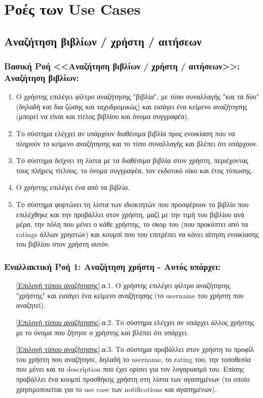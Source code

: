 \documentclass[12pt,a4paper]{article}
\begin{document}
\section{Ροές των Use Cases}
\label{Ροές των Use Cases}

\subsection{Αναζήτηση βιβλίων / χρήστη / αιτήσεων}

\subsubsection*{Βασική Ροή <<Αναζήτηση βιβλίων / χρήστη / αιτήσεων>>: Αναζήτηση βιβλίων:}
\begin{enumerate}
    \item Ο χρήστης επιλέγει φίλτρο αναζήτησης "βιβλία", με τύπο συναλλαγής "και τα δύο" (δηλαδή και δια ζώσης και ταχυδρομικώς) και εισάγει ένα κείμενο αναζήτησης (μπορεί να είναι και τίτλος βιβλίου και όνομα συγγραφέα).
        \label{Επιλογή τύπου αναζήτησης}
    \item Το σύστημα ελέγχει αν υπάρχουν διαθέσιμα βιβλία προς ενοικίαση που να πληρούν το κείμενο αναζήτησης και το τύπο συναλλαγής και βλέπει ότι υπάρχουν.
        \label{Ύπαρξη βιβλίου}
    \item Το σύστημα δείχνει τη λίστα με τα διαθέσιμα βιβλία στον χρήστη, περιέχοντας τους πλήρεις τίτλους, το όνομα συγγραφέα, τον εκδοτικό οίκο και έτος τύπωσης.
    \item Ο χρήστης επιλέγει ένα από τα βιβλία.
    \item Το σύστημα φορτώνει τη λίστα των ιδιοκτητών που προσφέρουν το βιβλίο που επιλέχθηκε και την προβάλλει στον χρήστη, μαζί με την τιμή του βιβλίου ανά μέρα, την πόλη που μένει ο κάθε χρήστης, το σκορ του (που προκύπτει από τα ratings άλλων χρηστών) και κουμπί που του επιτρέπει να κάνει αίτηση ενοικίασης του βιβλίου στον χρήστη αυτόν.
\end{enumerate}

\subsubsection*{Εναλλακτική Ροή 1: Αναζήτηση χρήστη - Αυτός υπάρχει:}
\begin{enumerate}
    \item[\ref{Επιλογή τύπου αναζήτησης}.α.1.] Ο χρήστης επιλέγει φίλτρο αναζήτησης "χρήστης" και εισάγει ένα κείμενο αναζήτησης (το username του χρήστη που αναζητεί).
    \item[\ref{Επιλογή τύπου αναζήτησης}.α.2.] Το σύστημα ελέγχει αν υπάρχει άλλος χρήστης με το όνομα που ζήτησε ο χρήστης και βλέπει ότι υπάρχει.
    \item[\ref{Επιλογή τύπου αναζήτησης}.α.3.] Το σύστημα προβάλλει στον χρήστη το προφίλ του χρήστη που αναζήτησε, δηλαδή το username, το rating του, την τοποθεσία που μένει και το description που έχει ορίσει για τον λογαριασμό του. Επίσης προβάλλει ένα κουμπί προσθήκης χρήστη στη λίστα των αγαπημένων (το οποίο χρησιμοποιείται για το use case των notifications και αγαπημένων).
\end{enumerate}
\end{document}
